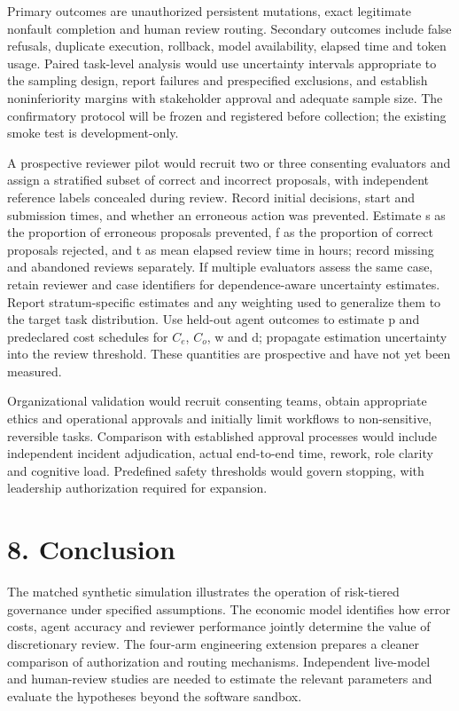 \documentclass[11pt,letterpaper]{article}
\begin{document}
Primary outcomes are unauthorized persistent mutations, exact legitimate nonfault completion and human review routing. Secondary outcomes include false refusals, duplicate execution, rollback, model availability, elapsed time and token usage. Paired task-level analysis would use uncertainty intervals appropriate to the sampling design, report failures and prespecified exclusions, and establish noninferiority margins with stakeholder approval and adequate sample size. The confirmatory protocol will be frozen and registered before collection; the existing smoke test is development-only.

A prospective reviewer pilot would recruit two or three consenting evaluators and assign a stratified subset of correct and incorrect proposals, with independent reference labels concealed during review. Record initial decisions, start and submission times, and whether an erroneous action was prevented. Estimate s as the proportion of erroneous proposals prevented, f as the proportion of correct proposals rejected, and t as mean elapsed review time in hours; record missing and abandoned reviews separately. If multiple evaluators assess the same case, retain reviewer and case identifiers for dependence-aware uncertainty estimates. Report stratum-specific estimates and any weighting used to generalize them to the target task distribution. Use held-out agent outcomes to estimate p and predeclared cost schedules for $C_e$, $C_o$, w and d; propagate estimation uncertainty into the review threshold. These quantities are prospective and have not yet been measured.

Organizational validation would recruit consenting teams, obtain appropriate ethics and operational approvals and initially limit workflows to non-sensitive, reversible tasks. Comparison with established approval processes would include independent incident adjudication, actual end-to-end time, rework, role clarity and cognitive load. Predefined safety thresholds would govern stopping, with leadership authorization required for expansion.

\section*{8. Conclusion}
The matched synthetic simulation illustrates the operation of risk-tiered governance under specified assumptions. The economic model identifies how error costs, agent accuracy and reviewer performance jointly determine the value of discretionary review. The four-arm engineering extension prepares a cleaner comparison of authorization and routing mechanisms. Independent live-model and human-review studies are needed to estimate the relevant parameters and evaluate the hypotheses beyond the software sandbox.
\end{document}
